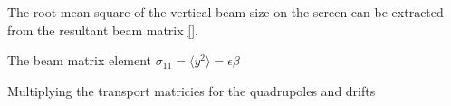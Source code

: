 The root mean square of the vertical beam size on the screen can be extracted
from the resultant beam matrix \ref{}.

The beam matrix element \(\sigma_{11} = \langle y^2 \rangle = \epsilon\beta\)

Multiplying the transport matricies for the quadrupoles and drifts



